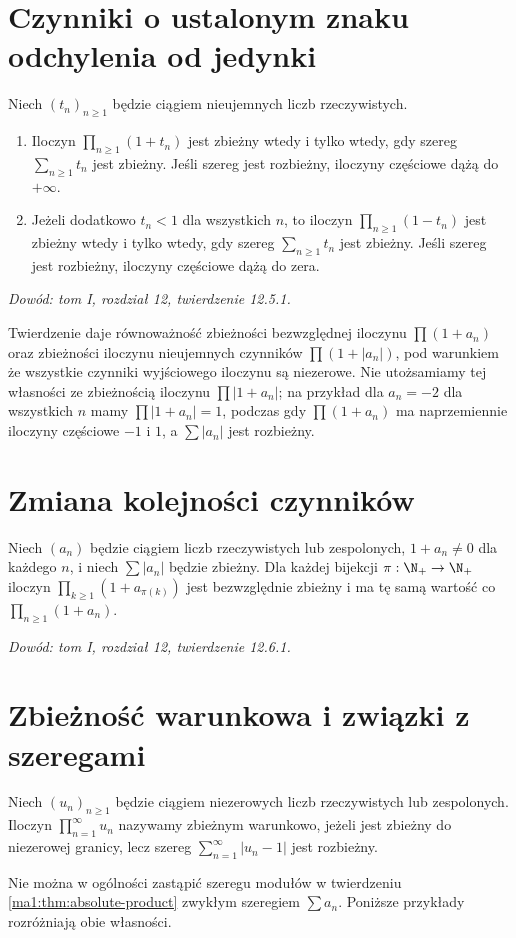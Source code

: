 \section{Czynniki o ustalonym znaku odchylenia od jedynki}
\begin{twierdzenie}
\label{ma1:thm:positive-product-series}
Niech $(t_n)_{n\ge1}$ będzie ciągiem nieujemnych liczb rzeczywistych.
\begin{enumerate}[label=(\roman*)]
\item Iloczyn $\prod_{n\ge1}(1+t_n)$ jest zbieżny wtedy i tylko wtedy, gdy szereg $\sum_{n\ge1}t_n$ jest zbieżny. Jeśli szereg jest rozbieżny, iloczyny częściowe dążą do $+\infty$.
\item Jeżeli dodatkowo $t_n<1$ dla wszystkich $n$, to iloczyn $\prod_{n\ge1}(1-t_n)$ jest zbieżny wtedy i tylko wtedy, gdy szereg $\sum_{n\ge1}t_n$ jest zbieżny. Jeśli szereg jest rozbieżny, iloczyny częściowe dążą do zera.
\end{enumerate}
\end{twierdzenie}
\emph{Dowód: tom I, rozdział 12, twierdzenie 12.5.1.}
\begin{uwaga}
Twierdzenie daje równoważność zbieżności bezwzględnej iloczynu $\prod(1+a_n)$ oraz zbieżności iloczynu nieujemnych czynników $\prod(1+|a_n|)$, pod warunkiem że wszystkie czynniki wyjściowego iloczynu są niezerowe. Nie utożsamiamy tej własności ze zbieżnością iloczynu $\prod |1+a_n|$; na przykład dla $a_n=-2$ dla wszystkich $n$ mamy $\prod |1+a_n|=1$, podczas gdy $\prod(1+a_n)$ ma naprzemiennie iloczyny częściowe $-1$ i $1$, a $\sum|a_n|$ jest rozbieżny.
\end{uwaga}

\section{Zmiana kolejności czynników}
\begin{twierdzenie}
\label{ma1:thm:product-rearrangement}
Niech $(a_n)$ będzie ciągiem liczb rzeczywistych lub zespolonych, $1+a_n\ne0$ dla każdego $n$, i niech $\sum|a_n|$ będzie zbieżny. Dla każdej bijekcji $\pi:\N_+\to\N_+$ iloczyn $\prod_{k\ge1}(1+a_{\pi(k)})$ jest bezwzględnie zbieżny i ma tę samą wartość co $\prod_{n\ge1}(1+a_n)$.
\end{twierdzenie}
\emph{Dowód: tom I, rozdział 12, twierdzenie 12.6.1.}

\section{Zbieżność warunkowa i związki z szeregami}
\begin{definicja}
\label{ma1:def:conditional-product}
Niech $(u_n)_{n\ge1}$ będzie ciągiem niezerowych liczb rzeczywistych lub zespolonych. Iloczyn $\prod_{n=1}^\infty u_n$ nazywamy zbieżnym warunkowo, jeżeli jest zbieżny do niezerowej granicy, lecz szereg $\sum_{n=1}^\infty|u_n-1|$ jest rozbieżny.
\end{definicja}
Nie można w ogólności zastąpić szeregu modułów w twierdzeniu \ref{ma1:thm:absolute-product} zwykłym szeregiem $\sum a_n$. Poniższe przykłady rozróżniają obie własności.

